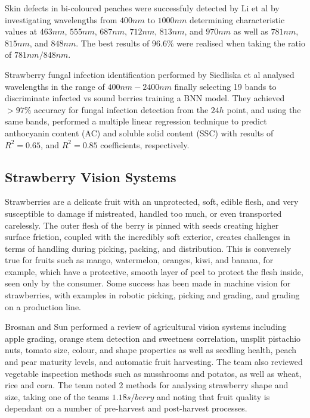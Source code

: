 \documentclass[fleqn,twoside]{article}
\begin{document}
Skin defects in bi-coloured peaches were successfuly detected by Li et al \cite{li2} by investigating wavelengths from $400nm$ to $1000nm$ determining characteristic values at $463nm$, $555nm$, $687nm$, $712nm$, $813nm$, and $970nm$ as well as $781nm$, $815nm$, and $848nm$. The best results of $96.6\%$ were realised when taking the ratio of $781nm/848nm$.

Strawberry fungal infection identification performed by Siedliska et al \cite{siedliska} analysed wavelengths in the range of $400nm-2400nm$ finally selecting 19 bands to discriminate infected vs sound berries training a BNN model. They achieved $>97\%$ accuracy for fungal infection detection from the $24h$ point, and using the same bands, performed a multiple linear regression technique to predict anthocyanin content (AC) and soluble solid content (SSC) with results of $R^2=0.65$, and $R^2=0.85$ coefficients, respectively.





\subsection{Strawberry Vision Systems}

Strawberries are a delicate fruit with an unprotected, soft, edible flesh, and very susceptible to damage if mistreated, handled too much, or even transported carelessly. The outer flesh of the berry is pinned with seeds creating higher surface friction, coupled with the incredibly soft exterior, creates challenges in terms of handling during picking, packing, and distribution. This is conversely true for fruits such as mango, watermelon, oranges, kiwi, and banana, for example, which have a protective, smooth layer of peel to protect the flesh inside, seen only by the consumer. Some success has been made in machine vision for strawberries, with examples in robotic picking, picking and grading, and grading on a production line. 

Brosnan and Sun \cite{brosnan} performed a review of agricultural vision systems including apple grading, orange stem detection and sweetness correlation, unsplit pistachio nuts, tomato size, colour, and shape properties as well as seedling health, peach and pear maturity levels, and automatic fruit harvesting. The team also reviewed vegetable inspection methods such as musshrooms and potatos, as well as wheat, rice and corn. The team noted 2 methods for analysing strawberry shape and size, taking one of the teams $1.18 s/berry$ and noting that fruit quality is dependant on a number of pre-harvest and post-harvest processes. 
\end{document}
